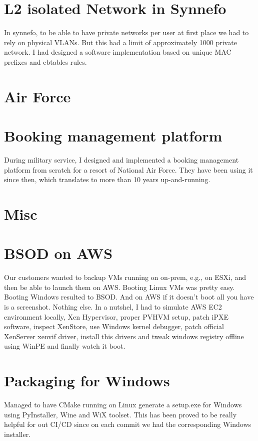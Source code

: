 \documentclass[margin,centered]{res}
\begin{document}
\begin{resume}
\section{\sc L2 isolated Network in Synnefo}
In synnefo, to be able to have private networks per user at first place we
had to rely on physical VLANs. But this had a limit of approximately 1000
private network. I had designed a software implementation based on unique MAC
prefixes and ebtables rules.

\section{Air Force}

\section{\sc Booking management platform}
During military service, I designed and implemented a booking management
platform from scratch for a resort of National Air Force. They have been using
it since then, which translates to more than 10 years up-and-running.

\section{Misc}

\section{\sc BSOD on AWS}
Our customers wanted to backup VMs running on on-prem, e.g., on ESXi, and then
be able to launch them on AWS. Booting Linux VMs was pretty easy. Booting
Windows resulted to BSOD. And on AWS if it doesn't boot all you have is a
screenshot. Nothing else. In a nutshel, I had to simulate AWS EC2 environment
locally, Xen Hypervisor, proper PVHVM setup, patch iPXE software, inspect
XenStore, use Windows kernel debugger, patch official XenServer xenvif driver,
install this drivers and tweak windows registry offline using WinPE and
finally watch it boot.

\section{\sc Packaging for Windows}
Managed to have CMake running on Linux generate a setup.exe for Windows using
PyInstaller, Wine and WiX toolset. This has been proved to be really helpful for
out CI/CD since on each commit we had the corresponding Windows installer.


\end{resume}
\end{document}
